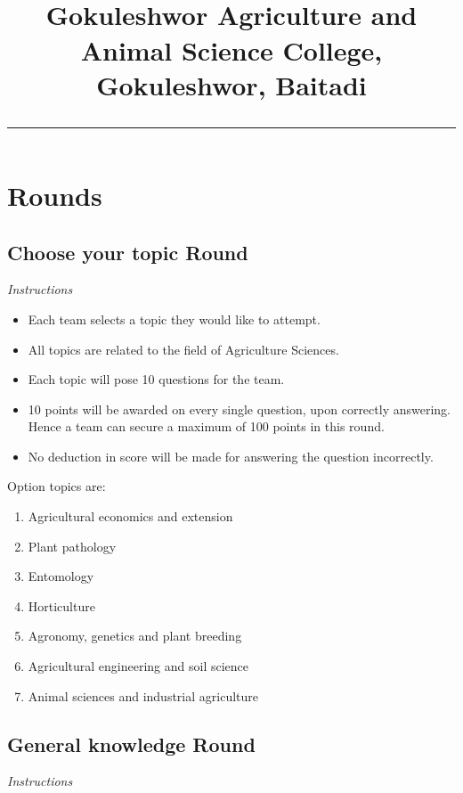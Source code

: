 \documentclass[a4paper,12pt]{exam}
\title{\vspace{-1.5cm}{\huge \textbf{Quiz contest, 2076}}\\[2mm]
\textbf{Gokuleshwor Agriculture and Animal Science College, Gokuleshwor, Baitadi} \\[2mm]
\hrule
}
\date{}
\begin{document}
\maketitle

\section*{Rounds}

\subsection*{Choose your topic Round}

{\Large \textit{Instructions}}

\begin{itemize}
\item	Each team selects a topic they would like to attempt.
\item All topics are related to the field of Agriculture Sciences.
\item	Each topic will pose 10 questions for the team.
\item	10 points will be awarded on every single question, upon correctly answering. Hence a team can secure a maximum of 100 points in this round.
\item No deduction in score will be made for answering the question incorrectly.
\end{itemize}

Option topics are:

\begin{enumerate}
  \item Agricultural economics and extension
  \item Plant pathology
  \item Entomology
  \item Horticulture
  \item Agronomy, genetics and plant breeding
  \item Agricultural engineering and soil science
  \item Animal sciences and industrial agriculture
\end{enumerate}

\subsection*{General knowledge Round}

{\Large \textit{Instructions}}
\end{document}
